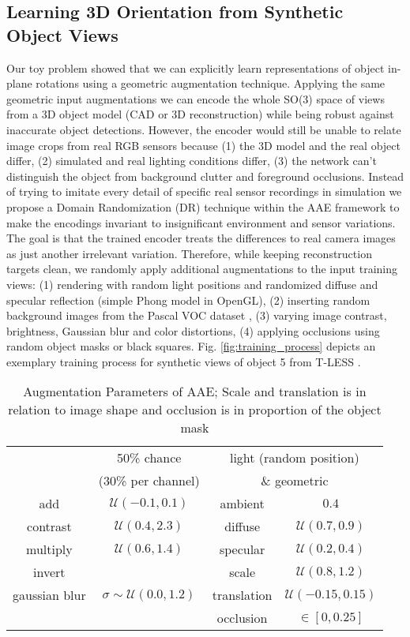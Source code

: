 \subsection{Learning 3D Orientation from Synthetic Object Views}
Our toy problem showed that we can explicitly learn representations of object in-plane rotations using a geometric augmentation technique. Applying the same geometric input augmentations we can encode the whole SO(3) space of views from a 3D object model (CAD or 3D reconstruction) while being robust against inaccurate object detections. However, the encoder would still be unable to relate image crops from real RGB sensors because 
(1) the 3D model and the real object differ, (2) simulated and real lighting conditions differ, (3) the network can't distinguish the object from background clutter and foreground occlusions. 
Instead of trying to imitate every detail of specific real sensor recordings in simulation we propose a Domain Randomization (DR) technique within the \gls{AAE} framework to make the encodings invariant to insignificant environment and sensor variations. The goal is that the trained encoder treats the differences to real camera images as just another irrelevant variation. Therefore, while keeping reconstruction targets clean, we randomly apply additional augmentations to the input training views: (1) rendering with random light positions and randomized diffuse and specular reflection (simple Phong model \citep{phong1975illumination} in OpenGL), (2) inserting random background images from the Pascal VOC dataset \citep{pascalvoc2012}, (3) varying image contrast, brightness, Gaussian blur and color distortions, (4) applying occlusions using random object masks or black squares. Fig. \ref{fig:training_process} depicts an exemplary training process for synthetic views of object 5 from T-LESS \citep{hodan2017tless}.

\begin{table}[t]
	\scriptsize
	\centering
	\captionsetup{width=0.9\columnwidth}
	\caption{Augmentation Parameters of \gls{AAE}; Scale and translation is in relation to image shape and occlusion is in proportion of the object mask}
	\begin{tabular}{cc|cc}
		\toprule
		& 50\% chance &\multicolumn{2}{c}{light (random position) } \\
		& (30\% per channel) & \multicolumn{2}{c}{\& geometric}\\
		\midrule
		add & $\mathcal{U}(-0.1,0.1)$ & ambient &$0.4$ \\
		contrast & $\mathcal{U}(0.4,2.3)$ &diffuse &$\mathcal{U}(0.7,0.9)$\\
		multiply & $\mathcal{U}(0.6,1.4)$ & specular&$\mathcal{U}(0.2,0.4)$ \\
		invert &  & scale &$\mathcal{U}(0.8,1.2)$\\
		gaussian blur & $\sigma \sim \mathcal{U}(0.0,1.2)$ & translation & $\mathcal{U}(-0.15,0.15)$\\
		&& occlusion & $\in [0,0.25]$ 
	\end{tabular}
	\label{tab:aug_strong_col}
\end{table}


